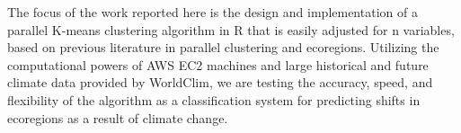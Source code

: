\documentclass[a4paper,10pt]{article}
\begin{document}
The focus of the work reported here is the design and implementation of a parallel K-means clustering algorithm in 
R that is easily adjusted for n variables, based on previous literature in parallel clustering and ecoregions. 
Utilizing the computational powers of AWS EC2 machines and large historical and future climate data provided by 
WorldClim, we are testing the accuracy, speed, and flexibility of the algorithm as a classification system for 
predicting shifts in ecoregions as a result of climate change.




\end{document}
